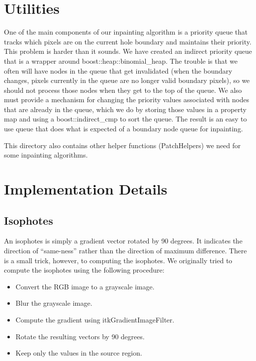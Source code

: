 \documentclass{InsightArticle}
\begin{document}
\section{Utilities}
One of the main components of our inpainting algorithm is a priority queue that tracks which pixels are on the current hole boundary and maintains their priority. This problem is harder than it sounds. We have created an indirect priority queue that is a wrapper around boost::heap::binomial_heap. The trouble is that we often will have nodes in the queue that get invalidated (when the boundary changes, pixels currently in the queue are no longer valid boundary pixels), so we should not process those nodes when they get to the top of the queue. We also must provide a mechanism for changing the priority values associated with nodes that are already in the queue, which we do by storing those values in a property map and using a boost::indirect_cmp to sort the queue. The result is an easy to use queue that does what is expected of a boundary node queue for inpainting.

This directory also contains other helper functions (PatchHelpers) we need for some inpainting algorithms.
\section{Implementation Details}
\label{sec:ImplementationDetails}

\subsection{Isophotes}
An isophotes is simply a gradient vector rotated by 90 degrees. It indicates the direction of ``same-ness'' rather than the direction of maximum difference. There is a small trick, however, to computing the isophotes. We originally tried to compute the isophotes using the following procedure:

\begin{itemize}
 \item Convert the RGB image to a grayscale image.
 \item Blur the grayscale image.
 \item Compute the gradient using itkGradientImageFilter.
 \item Rotate the resulting vectors by 90 degrees.
 \item Keep only the values in the source region.
\end{itemize}
\end{document}
